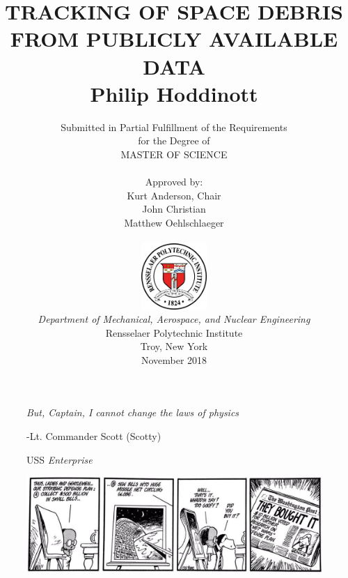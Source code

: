 \documentclass[12pt]{report}
\title{ 
		\LARGE \textbf{\uppercase{Tracking of space debris from publicly available data }} \\
		\vspace{0.25cm}
		\LARGE \textbf{Philip Hoddinott}
	}
\author{\small{Submitted in Partial Fulfillment of the Requirements} \\ \small{for the Degree of} \\
		\uppercase{Master of Science} \\ \\
		Approved by:
		\\ Kurt Anderson, Chair \\ John Christian \\ Matthew Oehlschlaeger \\ \\ %
		\includegraphics[width=2.5cm]{rensselaer_seal.png} \\
		\small{\textit{Department of Mechanical, Aerospace, and Nuclear Engineering}} \\
		\small{Rensselaer Polytechnic Institute} \\ 
		\small{Troy, New York} \\
		\small{November 2018}
	}
\begin{document}
	\maketitle
	
	
	\setcounter{page}{-1}
	\tableofcontents
	\newpage
	\newlength\longest
	\clearpage
	
	\thispagestyle{empty}
	\null\vfill
	
	\begin{figure}[!t]
		\begin{center}
			\settowidth{}
			\parbox{\longest}{%
				\raggedright{\huge\itshape%
					But, Captain, I cannot change the laws of physics\par\bigskip
				}   
				\raggedleft\Large{-Lt. Commander Scott (Scotty)}\par
				\raggedleft\Large{USS}\textit{ Enterprise}\par%
				
			}
		\end{center}
	\end{figure}
	
	\null\vfill
	
	\begin{figure}
		\centering
		\includegraphics[width=0.7\linewidth]{../../Bloom_County}
		\caption*{}
		\label{fig:bloomcounty}
	\end{figure}
	
	\newpage

	
	\listoftables
	\listoffigures
	
	\newpage
		\doublespacing
\end{document}
